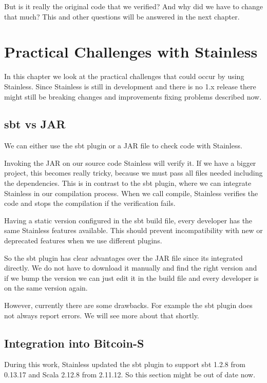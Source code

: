 \documentclass[runningheads]{llncs}
\begin{document}
But is it really the original code that we verified?
And why did we have to change that much?
This and other questions will be answered in the next chapter.


\section{Practical Challenges with Stainless}
\label{chap:appendix_arb}

In this chapter we look at the practical challenges that could occur
by using Stainless.  Since Stainless is still in development and there
is no 1.x release there might still be breaking changes and
improvements fixing problems described now.


\subsection{sbt vs JAR}

We can either use the sbt plugin or a JAR file to check code with Stainless.

Invoking the JAR on our source code Stainless will verify it.  If we
have a bigger project, this becomes really tricky, because we must
pass all files needed including the dependencies.  This is in contrast
to the sbt plugin, where we can integrate Stainless in our compilation
process.  When we call compile, Stainless verifies the code and stops
the compilation if the verification fails.

Having a static version configured in the sbt build file, every
developer has the same Stainless features available.  This should
prevent incompatibility with new or deprecated features when we use
different plugins.

So the sbt plugin has clear advantages over the JAR file since its
integrated directly.  We do not have to download it manually and find
the right version and if we bump the version we can just edit it in
the build file and every developer is on the same version again.

However, currently there are some drawbacks.  For example the sbt
plugin does not always report errors.  We will see more about that
shortly.


\subsection{Integration into Bitcoin-S}

During this work, Stainless updated the sbt plugin to support sbt
1.2.8 from 0.13.17 and Scala 2.12.8 from 2.11.12.  So this section
might be out of date now.
\end{document}
